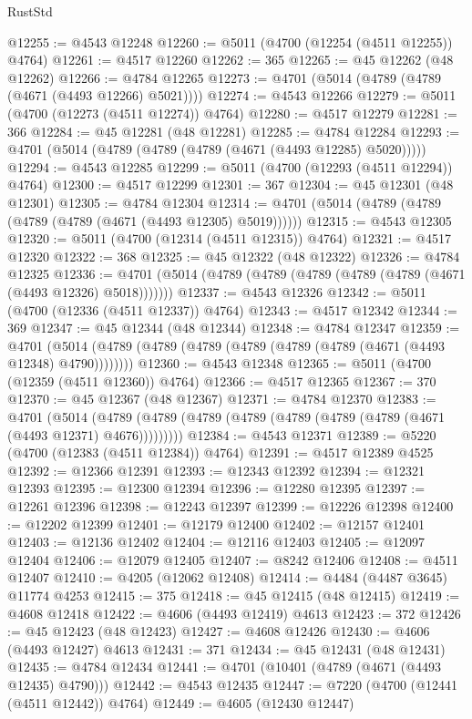 \begin{lexlean}{RustStd}
\begin{coremodule}
@12255 := @4543 @12248
@12260 := @5011 (@4700 (@12254 (@4511 @12255)) @4764)
@12261 := @4517 @12260
@12262 := 365
@12265 := @45 @12262 (@48 @12262)
@12266 := @4784 @12265
@12273 := @4701 (@5014 (@4789 (@4789 (@4671 (@4493 @12266) @5021))))
@12274 := @4543 @12266
@12279 := @5011 (@4700 (@12273 (@4511 @12274)) @4764)
@12280 := @4517 @12279
@12281 := 366
@12284 := @45 @12281 (@48 @12281)
@12285 := @4784 @12284
@12293 := @4701 (@5014 (@4789 (@4789 (@4789 (@4671 (@4493 @12285) @5020)))))
@12294 := @4543 @12285
@12299 := @5011 (@4700 (@12293 (@4511 @12294)) @4764)
@12300 := @4517 @12299
@12301 := 367
@12304 := @45 @12301 (@48 @12301)
@12305 := @4784 @12304
@12314 := @4701 (@5014 (@4789 (@4789 (@4789 (@4789 (@4671 (@4493 @12305) @5019))))))
@12315 := @4543 @12305
@12320 := @5011 (@4700 (@12314 (@4511 @12315)) @4764)
@12321 := @4517 @12320
@12322 := 368
@12325 := @45 @12322 (@48 @12322)
@12326 := @4784 @12325
@12336 := @4701 (@5014 (@4789 (@4789 (@4789 (@4789 (@4789 (@4671 (@4493 @12326) @5018)))))))
@12337 := @4543 @12326
@12342 := @5011 (@4700 (@12336 (@4511 @12337)) @4764)
@12343 := @4517 @12342
@12344 := 369
@12347 := @45 @12344 (@48 @12344)
@12348 := @4784 @12347
@12359 := @4701 (@5014 (@4789 (@4789 (@4789 (@4789 (@4789 (@4789 (@4671 (@4493 @12348) @4790))))))))
@12360 := @4543 @12348
@12365 := @5011 (@4700 (@12359 (@4511 @12360)) @4764)
@12366 := @4517 @12365
@12367 := 370
@12370 := @45 @12367 (@48 @12367)
@12371 := @4784 @12370
@12383 := @4701
    (@5014 (@4789 (@4789 (@4789 (@4789 (@4789 (@4789 (@4789 (@4671 (@4493 @12371) @4676)))))))))
@12384 := @4543 @12371
@12389 := @5220 (@4700 (@12383 (@4511 @12384)) @4764)
@12391 := @4517 @12389 @4525
@12392 := @12366 @12391
@12393 := @12343 @12392
@12394 := @12321 @12393
@12395 := @12300 @12394
@12396 := @12280 @12395
@12397 := @12261 @12396
@12398 := @12243 @12397
@12399 := @12226 @12398
@12400 := @12202 @12399
@12401 := @12179 @12400
@12402 := @12157 @12401
@12403 := @12136 @12402
@12404 := @12116 @12403
@12405 := @12097 @12404
@12406 := @12079 @12405
@12407 := @8242 @12406
@12408 := @4511 @12407
@12410 := @4205 (@12062 @12408)
@12414 := @4484 (@4487 @3645) @11774 @4253
@12415 := 375
@12418 := @45 @12415 (@48 @12415)
@12419 := @4608 @12418
@12422 := @4606 (@4493 @12419) @4613
@12423 := 372
@12426 := @45 @12423 (@48 @12423)
@12427 := @4608 @12426
@12430 := @4606 (@4493 @12427) @4613
@12431 := 371
@12434 := @45 @12431 (@48 @12431)
@12435 := @4784 @12434
@12441 := @4701 (@10401 (@4789 (@4671 (@4493 @12435) @4790)))
@12442 := @4543 @12435
@12447 := @7220 (@4700 (@12441 (@4511 @12442)) @4764)
@12449 := @4605 (@12430 @12447)

\end{coremodule}
\end{lexlean}
